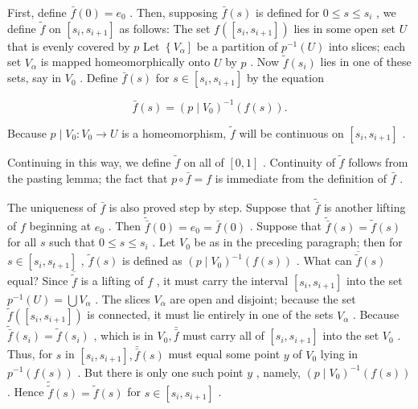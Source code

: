 \documentclass[10pt]{article}
\begin{document}
First, define \(\bar{f}\left( 0\right)  = {e}_{0}\) . Then, supposing \(\bar{f}\left( s\right)\) is defined for \(0 \leq  s \leq  {s}_{i}\) , we define \(\widetilde{f}\) on \(\left\lbrack  {{s}_{i},{s}_{i + 1}}\right\rbrack\) as follows: The set \(f\left( \left\lbrack  {{s}_{i},{s}_{i + 1}}\right\rbrack  \right)\) lies in some open set \(U\) that is evenly covered by \(p\) Let \(\left\{  {V}_{\alpha }\right\rbrack\) be a partition of \({p}^{-1}\left( U\right)\) into slices; each set \({V}_{\alpha }\) is mapped homeomorphically onto \(U\) by \(p\) . Now \(\widetilde{f}\left( {s}_{i}\right)\) lies in one of these sets, say in \({V}_{0}\) . Define \(\bar{f}\left( s\right)\) for \(s \in  \left\lbrack  {{s}_{i},{s}_{i + 1}}\right\rbrack\) by the equation

\[
\bar{f}\left( s\right)  = {\left( p \mid  {V}_{0}\right) }^{-1}\left( {f\left( s\right) }\right) .
\]

Because \(p \mid  {V}_{0} : {V}_{0} \rightarrow  U\) is a homeomorphism, \(\widetilde{f}\) will be continuous on \(\left\lbrack  {{s}_{i},{s}_{i + 1}}\right\rbrack\) .

Continuing in this way, we define \(\widetilde{f}\) on all of \(\left\lbrack  {0,1}\right\rbrack\) . Continuity of \(\widetilde{f}\) follows from the pasting lemma; the fact that \(p \circ  \bar{f} = f\) is immediate from the definition of \(\bar{f}\) .

The uniqueness of \(\bar{f}\) is also proved step by step. Suppose that \(\widetilde{\bar{f}}\) is another lifting of \(f\) beginning at \({e}_{0}\) . Then \(\widetilde{\bar{f}}\left( 0\right)  = {e}_{0} = \bar{f}\left( 0\right)\) . Suppose that \(\widetilde{\bar{f}}\left( s\right)  = \widetilde{f}\left( s\right)\) for all \(s\) such that \(0 \leq  s \leq  {s}_{i}\) . Let \({V}_{0}\) be as in the preceding paragraph; then for \(s \in  \left\lbrack  {{s}_{i},{s}_{t + 1}}\right\rbrack\) , \(\widetilde{f}\left( s\right)\) is defined as \({\left( p \mid  {V}_{0}\right) }^{-1}\left( {f\left( s\right) }\right)\) . What can \(\overline{\widetilde{f}}\left( s\right)\) equal? Since \(\overline{\widetilde{f}}\) is a lifting of \(f\) , it must carry the interval \(\left\lbrack  {{s}_{i},{s}_{i + 1}}\right\rbrack\) into the set \({p}^{-1}\left( U\right)  = \bigcup {V}_{\alpha }\) . The slices \({V}_{\alpha }\) are open and disjoint; because the set \(\widetilde{f}\left( \left\lbrack  {{s}_{i},{s}_{i + 1}}\right\rbrack  \right)\) is connected, it must lie entirely in one of the sets \({V}_{\alpha }\) . Because \(\widetilde{\bar{f}}\left( {s}_{i}\right)  = \widetilde{f}\left( {s}_{i}\right)\) , which is in \({V}_{0},\bar{\bar{f}}\) must carry all of \(\left\lbrack  {{s}_{i},{s}_{i + 1}}\right\rbrack\) into the set \({V}_{0}\) . Thus, for \(s\) in \(\left\lbrack  {{s}_{i},{s}_{i + 1}}\right\rbrack  ,\bar{\bar{f}}\left( s\right)\) must equal some point \(y\) of \({V}_{0}\) lying in \({p}^{-1}\left( {f\left( s\right) }\right)\) . But there is only one such point \(y\) , namely, \({\left( p \mid  {V}_{0}\right) }^{-1}\left( {f\left( s\right) }\right)\) . Hence \(\widetilde{\widetilde{f}}\left( s\right)  = \widetilde{f}\left( s\right)\) for \(s \in  \left\lbrack  {{s}_{i},{s}_{i + 1}}\right\rbrack\) .
\end{document}
